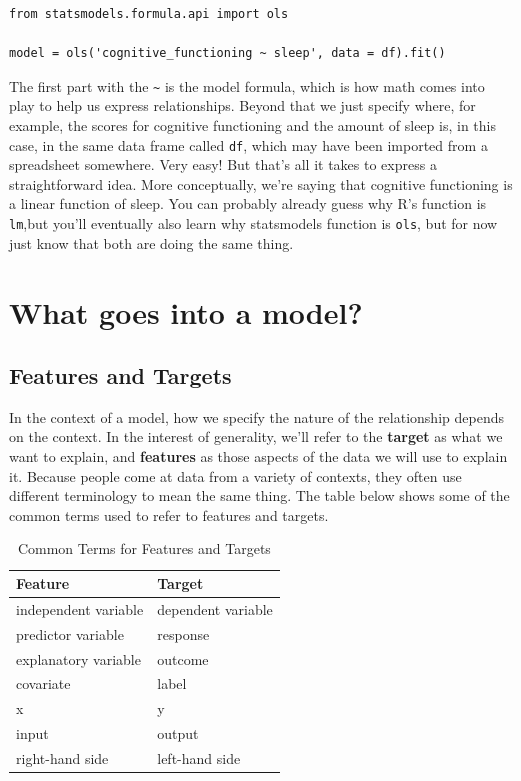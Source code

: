 \documentclass[
  letterpaper,
]{krantz}
\begin{document}
\begin{verbatim}
from statsmodels.formula.api import ols

model = ols('cognitive_functioning ~ sleep', data = df).fit()
\end{verbatim}

The first part with the \texttt{\textasciitilde{}} is the model formula,
which is how math comes into play to help us express relationships.
Beyond that we just specify where, for example, the scores for cognitive
functioning and the amount of sleep is, in this case, in the same data
frame called \texttt{df}, which may have been imported from a
spreadsheet somewhere. Very easy! But that's all it takes to express a
straightforward idea. More conceptually, we're saying that cognitive
functioning is a linear function of sleep. You can probably already
guess why R's function is \texttt{lm},but you'll eventually also learn
why {statsmodels} function is \texttt{ols}, but for now just know that
both are doing the same thing.

\section{What goes into a model?}\label{sec-lm-in-a-model}

\subsection{Features and Targets}\label{sec-lm-features-targets}

In the context of a model, how we specify the nature of the relationship
depends on the context. In the interest of generality, we'll refer to
the \textbf{target} as what we want to explain, and \textbf{features} as
those aspects of the data we will use to explain it. Because people come
at data from a variety of contexts, they often use different terminology
to mean the same thing. The table below shows some of the common terms
used to refer to features and targets.

\hypertarget{tbl-feature-target-names}{}
\begin{longtable}{ll}
\caption{\label{tbl-feature-target-names}Common Terms for Features and Targets }\tabularnewline

\toprule
Feature & Target \\ 
\midrule\addlinespace[2.5pt]
independent variable & dependent variable \\ 
predictor variable & response \\ 
explanatory variable & outcome \\ 
covariate & label \\ 
x & y \\ 
input & output \\ 
right-hand side & left-hand side \\ 
\bottomrule
\end{longtable}
\end{document}
